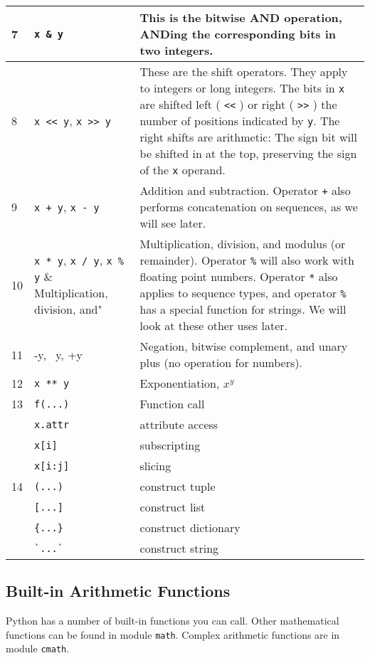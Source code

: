 \begin{longtable}{l|p{3cm}|p{7cm}}
  7 & \verb"x & y" & This is the bitwise AND operation,
ANDing the corresponding bits in two integers. \\
%
\midrule

8 & \verb"x << y", \verb"x >> y" & These are the shift operators.
They apply to integers or long integers. The bits in \texttt{x} are
shifted left ( \texttt{\textless{}\textless{}} ) or right (
\texttt{\textgreater{}\textgreater{}} ) the number of positions indicated
by \texttt{y}. The right shifts are arithmetic: The sign bit will be
shifted in at the top, preserving the sign of the \texttt{x} operand. \\
%
\midrule
9 & \verb"x + y", \verb"x - y" & Addition and subtraction. Operator
\texttt{+} also performs concatenation on sequences, as we will see later.\\
%
\midrule
10 & \verb"x * y", \verb"x / y", \verb"x % y" & Multiplication, division, and
modulus (or remainder). Operator \texttt{\%} will also work with floating
point numbers. Operator \texttt{*} also applies to sequence types, and
operator \texttt{\%} has a special function for strings. We will look at
these other uses later.\\
%
\midrule
11 & -y, ~y, +y & Negation, bitwise complement, and
unary plus (no operation for numbers).\\
%
\midrule
12 & \verb"x ** y" & Exponentiation, $x^y$ \\
%
\midrule
13 & \verb"f(...)" & Function call \\
%
 & \verb"x.attr" & attribute access \\
%
 & \verb"x[i]" & subscripting \\
%
 & \verb"x[i:j]" & slicing \\
%
\midrule
14 & \verb"(...)" & construct tuple \\
%
 & \verb"[...]" & construct list \\
%
 & \verb"{...}" & construct dictionary \\
%
 & \verb"`...`" & construct string \\
%
\bottomrule
\end{longtable}


\subsection{Built-in Arithmetic Functions}
\label{built-in-arithmetic-functions}

Python has a number of built-in functions you can call.
Other mathematical functions can be found in module \texttt{math}.
Complex arithmetic functions are in module \texttt{cmath}.


